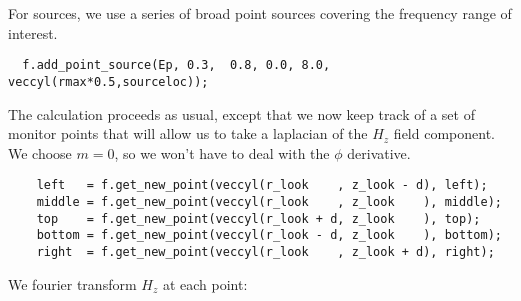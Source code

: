 \begin{comment}
  s.output_slices();

  fields f(&s, m);
\end{comment}

For sources, we use a series of broad point sources covering the frequency
range of interest.

\begin{verbatim}
  f.add_point_source(Ep, 0.3,  0.8, 0.0, 8.0, veccyl(rmax*0.5,sourceloc));
\end{verbatim}
\begin{comment}
  master_printf("Working with a=%
  monitor_point *left = NULL, *right = NULL, *middle = NULL,
                *top = NULL, *bottom = NULL;
  double next_printtime = 10;
  while (f.time() < 130 && !interrupt) {
    if (f.time() >= next_printtime) {
      next_printtime += 10;
      master_printf("Working on time %
      master_printf("energy is %
      //if (f.time() > -90) f.eps_slices();
    }
    f.step();
\end{comment}

The calculation proceeds as usual, except that we now keep track of a set
of monitor points that will allow us to take a laplacian of the $H_z$ field
component.  We choose $m=0$, so we won't have to deal with the $\phi$
derivative.

\begin{verbatim}
    left   = f.get_new_point(veccyl(r_look    , z_look - d), left);
    middle = f.get_new_point(veccyl(r_look    , z_look    ), middle);
    top    = f.get_new_point(veccyl(r_look + d, z_look    ), top);
    bottom = f.get_new_point(veccyl(r_look - d, z_look    ), bottom);
    right  = f.get_new_point(veccyl(r_look    , z_look + d), right);
\end{verbatim}
\begin{comment}
  }

  grace g("eps", dirname);
  complex<double> *al, *ar, *am, *at, *ab, *freqs;
  int numl, numr;
  master_printf("Working on left fourier transform...\n");
  double minfreq = 0.101, maxfreq = 0.5;
  int numfreqs = 300;
\end{comment}

We fourier transform $H_z$ at each point:

